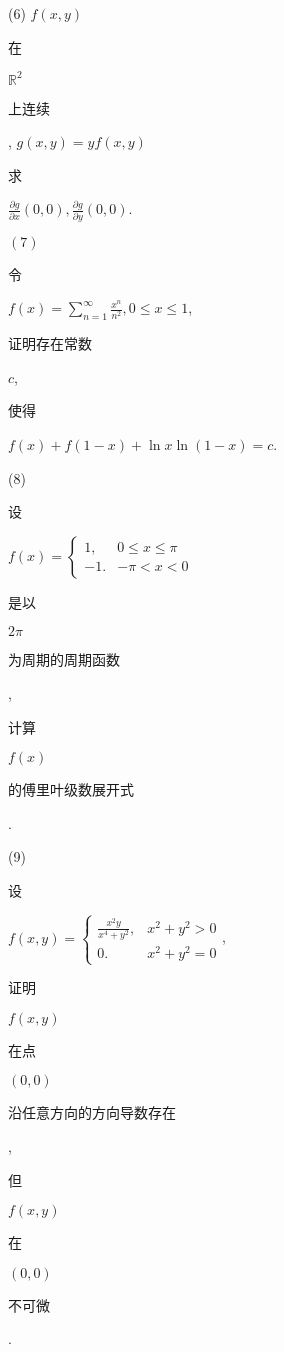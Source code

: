 \documentclass[10pt]{article}
\begin{document}
(6) $f(x, y)$ \begin{CJK}{UTF8}{mj}在\end{CJK} $\mathbb{R}^{2}$ \begin{CJK}{UTF8}{mj}上连续\end{CJK}, $g(x, y)=y f(x, y)$ \begin{CJK}{UTF8}{mj}求\end{CJK} $\frac{\partial g}{\partial x}(0,0), \frac{\partial g}{\partial y}(0,0)$.

$(7)$ \begin{CJK}{UTF8}{mj}令\end{CJK} $f(x)=\sum_{n=1}^{\infty} \frac{x^{n}}{n^{2}}, 0 \leqslant x \leqslant 1$, \begin{CJK}{UTF8}{mj}证明存在常数\end{CJK} $c$, \begin{CJK}{UTF8}{mj}使得\end{CJK} $f(x)+f(1-x)+\ln x \ln (1-x)=c$.

(8) \begin{CJK}{UTF8}{mj}设\end{CJK} $f(x)=\left\{\begin{array}{ll}1, & 0 \leqslant x \leqslant \pi \\ -1 . & -\pi<x<0\end{array}\right.$ \begin{CJK}{UTF8}{mj}是以\end{CJK} $2 \pi$ \begin{CJK}{UTF8}{mj}为周期的周期函数\end{CJK}, \begin{CJK}{UTF8}{mj}计算\end{CJK} $f(x)$ \begin{CJK}{UTF8}{mj}的傅里叶级数展开式\end{CJK}.

(9) \begin{CJK}{UTF8}{mj}设\end{CJK} $f(x, y)=\left\{\begin{array}{ll}\frac{x^{2} y}{x^{4}+y^{2}}, & x^{2}+y^{2}>0 \\ 0 . & x^{2}+y^{2}=0\end{array}\right.$, \begin{CJK}{UTF8}{mj}证明\end{CJK} $f(x, y)$ \begin{CJK}{UTF8}{mj}在点\end{CJK} $(0,0)$ \begin{CJK}{UTF8}{mj}沿任意方向的方向导数存在\end{CJK}, \begin{CJK}{UTF8}{mj}但\end{CJK} $f(x, y)$ \begin{CJK}{UTF8}{mj}在\end{CJK} $(0,0)$ \begin{CJK}{UTF8}{mj}不可微\end{CJK}.
\end{document}
